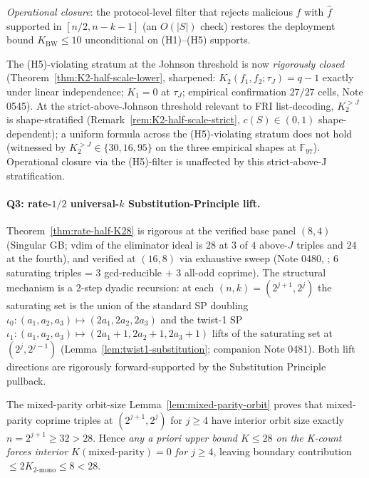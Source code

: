 \documentclass[11pt]{article}
\theoremstyle{definition}
\theoremstyle{remark}
\newcommand{\FF}{\mathbb{F}}
\begin{document}
\emph{Operational closure}: the protocol-level filter that rejects
malicious $f$ with $\widehat f$ supported in $[n/2, n-k-1]$ (an
$O(|S|)$ check) restores the deployment bound $K_{\mathrm{BW}} \leq 10$
unconditional on (H1)--(H5) supports.

The (H5)-violating stratum at the Johnson threshold is now
\emph{rigorously closed} (Theorem~\ref{thm:K2-half-scale-lower},
sharpened: $K_2(f_1, f_2; \tau_J) = q - 1$ exactly under linear
independence; $K_1 = 0$ at $\tau_J$; empirical confirmation $27/27$
cells, \cite{CompanionRepo} Note 0545).
At the strict-above-Johnson threshold relevant to FRI list-decoding,
$K_2^{>J}$ is shape-stratified
(Remark~\ref{rem:K2-half-scale-strict}, $c(S) \in (0, 1)$
shape-dependent); a uniform formula across the (H5)-violating stratum
does not hold (witnessed by $K_2^{>J} \in \{30, 16, 95\}$ on the three
empirical shapes at $\FF_{97}$). Operational closure via the
(H5)-filter is unaffected by this strict-above-J stratification.

\paragraph{Q3: rate-$1/2$ universal-$k$ Substitution-Principle
lift.}
Theorem~\ref{thm:rate-half-K28} is rigorous at the verified base
panel $(8, 4)$ (Singular GB; vdim of the eliminator ideal is $28$ at
$3$ of $4$ above-$J$ triples and $24$ at the fourth), and verified
at $(16, 8)$ via exhaustive sweep
(Note 0480, \cite{CompanionRepo}; $6$ saturating triples = $3$
gcd-reducible $+$ $3$ all-odd coprime). The structural mechanism is
a 2-step dyadic recursion: at each $(n, k) = (2^{j+1}, 2^j)$ the
saturating set is the union of the standard SP doubling
$\iota_0: (a_1, a_2, a_3) \mapsto (2a_1, 2a_2, 2a_3)$ and the twist-1
SP $\iota_1: (a_1, a_2, a_3) \mapsto (2a_1+1, 2a_2+1, 2a_3+1)$ lifts
of the saturating set at $(2^j, 2^{j-1})$ (Lemma~\ref{lem:twist1-substitution};
companion Note 0481). Both lift directions are rigorously
forward-supported by the Substitution Principle pullback.

The mixed-parity orbit-size Lemma~\ref{lem:mixed-parity-orbit}
proves that mixed-parity coprime triples at $(2^{j+1}, 2^j)$ for
$j \geq 4$ have interior orbit size exactly $n = 2^{j+1} \geq 32 > 28$.
Hence \emph{any a priori upper bound $K \leq 28$ on the K-count
forces interior $K(\text{mixed-parity}) = 0$ for $j \geq 4$}, leaving
boundary contribution $\leq 2 K_{2\text{-mono}} \leq 8 < 28$.
\end{document}
